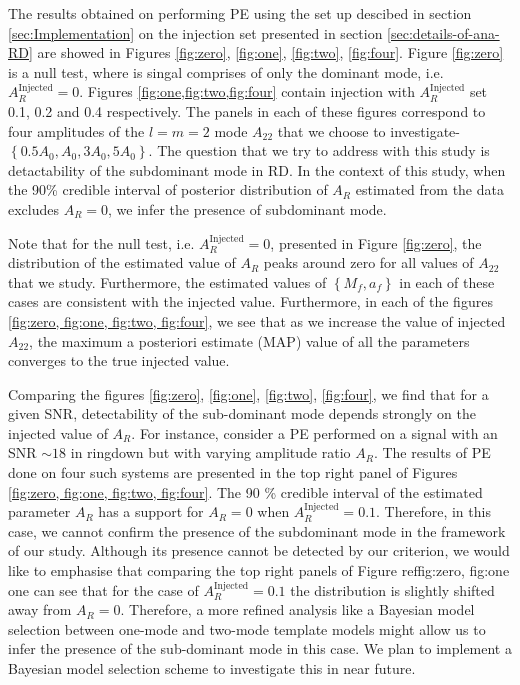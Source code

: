 The results obtained on performing PE using the set up descibed in section \ref{sec:Implementation} on the injection set presented in section \ref{sec:details-of-ana-RD} are showed in Figures \ref{fig:zero}, \ref{fig:one}, \ref{fig:two}, \ref{fig:four}. Figure \ref{fig:zero} is a null test, where is singal comprises of only the dominant mode, i.e. $A_{R}^{\mathrm{Injected}}=0$. Figures \ref{fig:one,fig:two,fig:four} contain injection with $A_{R}^{\mathrm{Injected}}$ set  0.1, 0.2
 and 0.4 respectively. The panels in each of these figures correspond to four amplitudes of the $l=m=2$ mode $A_{22}$ that we choose to investigate-  $\left\lbrace 0.5 A_{0}, A_{0}, 3A_{0}, 5A_{0}\right\rbrace $. The question that we try to address with this study is detactability of the subdominant mode in RD. In the context of this study, when the 90\% credible interval of posterior distribution of $A_{R}$ estimated from the data excludes $A_{R} = 0$, we infer the presence of subdominant mode.  

Note that for the null test, i.e. $A_{R}^{\mathrm{Injected}} =0$, presented in Figure \ref{fig:zero}, the distribution of the estimated value of $A_{R}$ peaks around zero for all values of $A_{22}$ that we study.  Furthermore, the estimated values of $ \left\lbrace M_{f},  a_{f} \right\rbrace$ in each of these cases are consistent with the injected value. Furthermore, in each of the figures \ref{fig:zero, fig:one, fig:two, fig:four}, we see that as we increase the value of injected $A_{22}$, the maximum a posteriori estimate (MAP) value of all the parameters converges to the true injected value. 

Comparing the figures \ref{fig:zero}, \ref{fig:one}, \ref{fig:two}, \ref{fig:four}, we find that for a given SNR, detectability of the sub-dominant mode depends strongly on the injected value of $A_{R}$. For instance, consider a PE performed on a signal with an SNR $\sim 18$ in ringdown but with varying amplitude ratio $A_{R}$. The results of PE done on four such systems are presented in the top right panel of Figures \ref{fig:zero, fig:one, fig:two, fig:four}.  The 90 \% credible interval of the estimated parameter $A_{R}$ has a support for $A_{R} =0$ when $A_{R}^{\mathrm{Injected}} = 0.1$. Therefore, in this case, we cannot confirm the presence of the subdominant mode in the framework of our study. Although its presence cannot be detected by our criterion, we would like to emphasise that comparing the top right panels of Figure ref{fig:zero, fig:one} one can see that for the case of $A_{R}^{\mathrm{Injected}} = 0.1$ the distribution is slightly shifted away from $A_{R}=0$. Therefore, a more refined analysis like a Bayesian model selection between one-mode and two-mode template models might allow us to infer the presence of the sub-dominant mode in this case. We plan to implement a Bayesian model selection scheme to investigate this in near future.  

